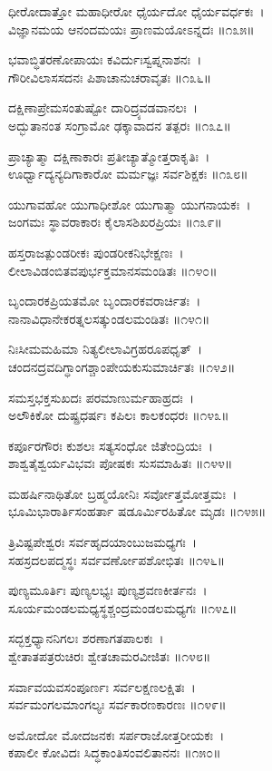 ಧೀರೋದಾತ್ತೋ ಮಹಾಧೀರೋ ಧೈರ್ಯದೋ ಧೈರ್ಯವರ್ಧಕಃ~।\\
ವಿಜ್ಞಾನಮಯ ಆನಂದಮಯಃ ಪ್ರಾಣಮಯೋಽನ್ನದಃ ॥೧೩೫॥

	ಭವಾಬ್ಧಿತರಣೋಪಾಯಃ ಕವಿರ್ದುಃಸ್ವಪ್ನನಾಶನಃ~।\\
	ಗೌರೀವಿಲಾಸಸದನಃ ಪಿಶಾಚಾನುಚರಾವೃತಃ ॥೧೩೬॥

ದಕ್ಷಿಣಾಪ್ರೇಮಸಂತುಷ್ಟೋ ದಾರಿದ್ರ್ಯವಡವಾನಲಃ~।\\
ಅದ್ಭುತಾನಂತ ಸಂಗ್ರಾಮೋ ಢಕ್ಕಾವಾದನ ತತ್ಪರಃ ॥೧೩೭॥

	ಪ್ರಾಚ್ಯಾತ್ಮಾ ದಕ್ಷಿಣಾಕಾರಃ ಪ್ರತೀಚ್ಯಾತ್ಮೋತ್ತರಾಕೃತಿಃ~।\\
	ಊರ್ಧ್ವಾದ್ಯನ್ಯದಿಗಾಕಾರೋ ಮರ್ಮಜ್ಞಃ ಸರ್ವಶಿಕ್ಷಕಃ ॥೧೩೮॥

ಯುಗಾವಹೋ ಯುಗಾಧೀಶೋ ಯುಗಾತ್ಮಾ ಯುಗನಾಯಕಃ~।\\
ಜಂಗಮಃ ಸ್ಥಾವರಾಕಾರಃ ಕೈಲಾಸಶಿಖರಪ್ರಿಯಃ ॥೧೩೯॥

	ಹಸ್ತರಾಜತ್ಪುಂಡರೀಕಃ ಪುಂಡರೀಕನಿಭೇಕ್ಷಣಃ~।\\
	ಲೀಲಾವಿಡಂಬಿತವಪುರ್ಭಕ್ತಮಾನಸಮಂಡಿತಃ ॥೧೪೦॥

ಬೃಂದಾರಕಪ್ರಿಯತಮೋ ಬೃಂದಾರಕವರಾರ್ಚಿತಃ~।\\
ನಾನಾವಿಧಾನೇಕರತ್ನಲಸತ್ಕುಂಡಲಮಂಡಿತಃ ॥೧೪೧॥

	ನಿಃಸೀಮಮಹಿಮಾ ನಿತ್ಯಲೀಲಾವಿಗ್ರಹರೂಪಧೃತ್~।\\
	ಚಂದನದ್ರವದಿಗ್ಧಾಂಗಶ್ಚಾಂಪೇಯಕುಸುಮಾರ್ಚಿತಃ ॥೧೪೨॥

ಸಮಸ್ತಭಕ್ತಸುಖದಃ ಪರಮಾಣುರ್ಮಹಾಹ್ರದಃ~।\\
ಅಲೌಕಿಕೋ ದುಷ್ಪ್ರಧರ್ಷಃ ಕಪಿಲಃ ಕಾಲಕಂಧರಃ ॥೧೪೩॥

	ಕರ್ಪೂರಗೌರಃ ಕುಶಲಃ ಸತ್ಯಸಂಧೋ ಜಿತೇಂದ್ರಿಯಃ~।\\
	ಶಾಶ್ವತೈಶ್ವರ್ಯವಿಭವಃ ಪೋಷಕಃ ಸುಸಮಾಹಿತಃ ॥೧೪೪॥

ಮಹರ್ಷಿನಾಥಿತೋ ಬ್ರಹ್ಮಯೋನಿಃ ಸರ್ವೋತ್ತಮೋತ್ತಮಃ~।\\
ಭೂಮಿಭಾರಾರ್ತಿಸಂಹರ್ತಾ ಷಡೂರ್ಮಿರಹಿತೋ ಮೃಡಃ ॥೧೪೫॥

	ತ್ರಿವಿಷ್ಟಪೇಶ್ವರಃ ಸರ್ವಹೃದಯಾಂಬುಜಮಧ್ಯಗಃ~।\\
	ಸಹಸ್ರದಲಪದ್ಮಸ್ಥಃ ಸರ್ವವರ್ಣೋಪಶೋಭಿತಃ ॥೧೪೬॥

ಪುಣ್ಯಮೂರ್ತಿಃ ಪುಣ್ಯಲಭ್ಯಃ ಪುಣ್ಯಶ್ರವಣಕೀರ್ತನಃ~।\\
ಸೂರ್ಯಮಂಡಲಮಧ್ಯಸ್ಥಶ್ಚಂದ್ರಮಂಡಲಮಧ್ಯಗಃ ॥೧೪೭॥

	ಸದ್ಭಕ್ತಧ್ಯಾನನಿಗಲಃ ಶರಣಾಗತಪಾಲಕಃ~।\\
	ಶ್ವೇತಾತಪತ್ರರುಚಿರಃ ಶ್ವೇತಚಾಮರವೀಜಿತಃ ॥೧೪೮॥

ಸರ್ವಾವಯವಸಂಪೂರ್ಣಃ ಸರ್ವಲಕ್ಷಣಲಕ್ಷಿತಃ~।\\
ಸರ್ವಮಂಗಲಮಾಂಗಲ್ಯಃ ಸರ್ವಕಾರಣಕಾರಣಃ ॥೧೪೯॥

	ಅಮೋದೋ ಮೋದಜನಕಃ ಸರ್ಪರಾಜೋತ್ತರೀಯಕಃ~।\\
	ಕಪಾಲೀ ಕೋವಿದಃ ಸಿದ್ಧಕಾಂತಿಸಂವಲಿತಾನನಃ ॥೧೫೦॥

